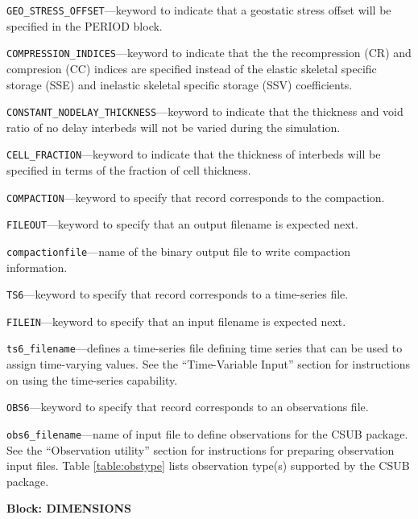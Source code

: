 \begin{description}
\item \texttt{GEO\_STRESS\_OFFSET}---keyword to indicate that a geostatic stress offset will be specified in the PERIOD block.

\item \texttt{COMPRESSION\_INDICES}---keyword to indicate that the the recompression (CR) and compresion (CC) indices are specified instead of the elastic skeletal specific storage (SSE) and inelastic skeletal specific storage (SSV) coefficients.

\item \texttt{CONSTANT\_NODELAY\_THICKNESS}---keyword to indicate that the thickness and void ratio of no delay interbeds will not be varied during the simulation.

\item \texttt{CELL\_FRACTION}---keyword to indicate that the thickness of interbeds will be specified in terms of the fraction of cell thickness.

\item \texttt{COMPACTION}---keyword to specify that record corresponds to the compaction.

\item \texttt{FILEOUT}---keyword to specify that an output filename is expected next.

\item \texttt{compactionfile}---name of the binary output file to write compaction information.

\item \texttt{TS6}---keyword to specify that record corresponds to a time-series file.

\item \texttt{FILEIN}---keyword to specify that an input filename is expected next.

\item \texttt{ts6\_filename}---defines a time-series file defining time series that can be used to assign time-varying values. See the ``Time-Variable Input'' section for instructions on using the time-series capability.

\item \texttt{OBS6}---keyword to specify that record corresponds to an observations file.

\item \texttt{obs6\_filename}---name of input file to define observations for the CSUB package. See the ``Observation utility'' section for instructions for preparing observation input files. Table \ref{table:obstype} lists observation type(s) supported by the CSUB package.

\end{description}
\item \textbf{Block: DIMENSIONS}

